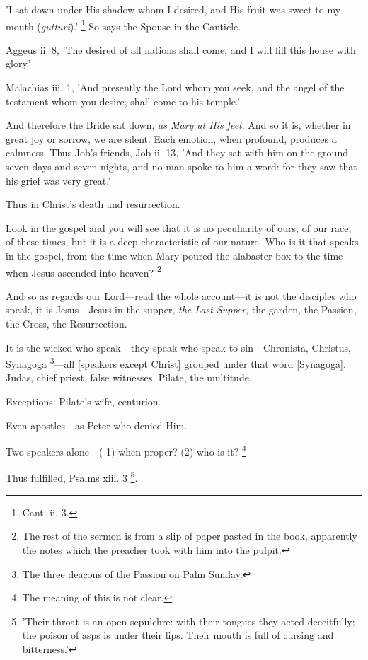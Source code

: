 
'I sat down under His shadow whom I desired, and
His fruit was sweet to my mouth (\emph{gutturi}).' \footnote{Cant. ii. 3.} So says the Spouse in the Canticle.

Aggeus ii. 8, 'The desired of all nations shall
come, and I will fill this house with glory.'

Malachias iii. 1, 'And presently the Lord whom
you seek, and the angel of the testament whom you desire, shall come
to his temple.'

And therefore the Bride sat down, \emph{as Mary at
His feet}. And so it is, whether in great joy or sorrow, we are
silent. Each emotion, when profound, produces a calmness. Thus Job's
friends, Job ii. 13, 'And they sat with him on the ground seven days
and seven nights, and no man spoke to him a word: for they saw that
his grief was very great.'

Thus in Christ's death and resurrection.

Look in the gospel and you will see that it is no
peculiarity of ours, of our race, of these times, but it is a
deep characteristic of our nature. Who is it that speaks in the
gospel, from the time when Mary poured the alabaster box to the time
when Jesus ascended into heaven? \footnote{The rest of the sermon is
from a slip of paper pasted in the book, apparently the notes which
the preacher took with him into the pulpit.}

And so as regards our Lord—read the whole
account—it is not the disciples who speak, it is Jesus—Jesus in
the supper, \emph{the Last Supper}, the garden, the Passion, the
Cross, the Resurrection.

It is the wicked who speak—they speak who speak
to sin—Chronista, Christus, Synagoga \footnote{The three deacons of the
Passion on Palm Sunday.}—all [speakers except Christ] grouped under that word [Synagoga].
Judas, chief priest, false witnesses, Pilate, the multitude.

Exceptions: Pilate's wife, centurion.

Even apostles—as Peter who denied Him.

Two speakers alone—( 1) when proper? (2) who is
it? \footnote{The meaning of this is not
clear.}

Thus fulfilled, Psalms xiii. 3 \footnote{'Their throat is an open
sepulchre: with their tongues they acted deceitfully; the poison of
asps is under their lips. Their mouth is full of cursing and
bitterness.'}.

